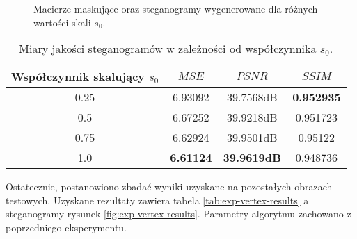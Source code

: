 {\begin{figure}
        \caption[Porównania wizualizacji konwersji oraz macierzy maskujących.]
        {
            Macierze maskujące oraz steganogramy wygenerowane dla różnych wartości skali $s_0$.
        }
        \label{fig:exp-vertex-scale}
    \end{figure}

    \begin{table}
        \centering
        \begin{tabular}{ |c|c c c| }
            \hline
            Współczynnik skalujący \newline $s_0$ & $MSE$ & $PSNR$ & $SSIM$ \\
            \hline
            0.25 & 6.93092 & 39.7568dB & \textbf{0.952935} \\
            0.5 & 6.67252 & 39.9218dB & 0.951723 \\
            0.75 & 6.62924 & 39.9501dB & 0.95122 \\
            1.0 & \textbf{6.61124} & \textbf{39.9619dB} & 0.948736 \\
            \hline
        \end{tabular}
        \caption{Miary jakości steganogramów w zależności od współczynnika $s_0$.}
        \label{tab:exp-vertex-scale-errors}
    \end{table}

    Ostatecznie, postanowiono zbadać wyniki uzyskane na pozostałych obrazach testowych. Uzyskane rezultaty zawiera
    tabela \ref{tab:exp-vertex-results} a steganogramy rysunek \ref{fig:exp-vertex-results}. Parametry algorytmu
    zachowano z poprzedniego eksperymentu.

}
